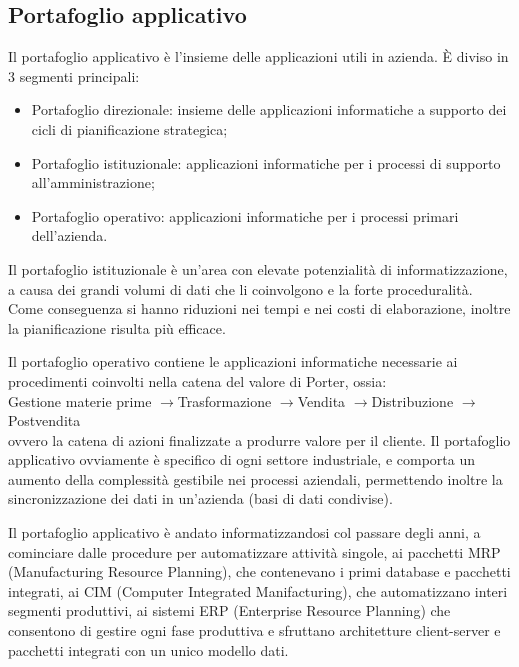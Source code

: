 \documentclass[a4paper, 10pt]{article}
\newcommand{\chainto}{$ \to $}
\begin{document}
	\subsection{Portafoglio applicativo}
	Il portafoglio applicativo è l'insieme delle applicazioni utili in azienda. È diviso in 3 segmenti principali: \begin{itemize}
		\item Portafoglio direzionale: insieme delle applicazioni informatiche a supporto dei cicli di pianificazione strategica;
		
		\item Portafoglio istituzionale: applicazioni informatiche per i processi di supporto all’amministrazione;
		
		\item Portafoglio operativo: applicazioni informatiche per i processi primari dell’azienda.
	\end{itemize}

	Il portafoglio istituzionale è un'area con elevate potenzialità di informatizzazione, a causa dei grandi volumi di dati che li coinvolgono e la forte proceduralità. Come conseguenza si hanno riduzioni nei tempi e nei costi di elaborazione, inoltre la pianificazione risulta più efficace.
	
	Il portafoglio operativo contiene le applicazioni informatiche necessarie ai procedimenti coinvolti nella catena del valore di Porter, ossia: \\
	
	Gestione materie prime \chainto Trasformazione \chainto Vendita \chainto Distribuzione \chainto Postvendita \\
	
	ovvero la catena di azioni finalizzate a produrre valore per il cliente. Il portafoglio applicativo ovviamente è specifico di ogni settore industriale, e comporta un aumento della complessità gestibile nei processi aziendali, permettendo inoltre la sincronizzazione dei dati in un'azienda (basi di dati condivise).
	
	Il portafoglio applicativo è andato informatizzandosi col passare degli anni, a cominciare dalle procedure per automatizzare attività singole, ai pacchetti MRP (Manufacturing Resource Planning), che contenevano i primi database e pacchetti integrati, ai CIM (Computer Integrated Manifacturing), che automatizzano interi segmenti produttivi, ai sistemi ERP (Enterprise Resource Planning) che consentono di gestire ogni fase produttiva e sfruttano architetture client-server e pacchetti integrati con un unico modello dati.
	
\end{document}
